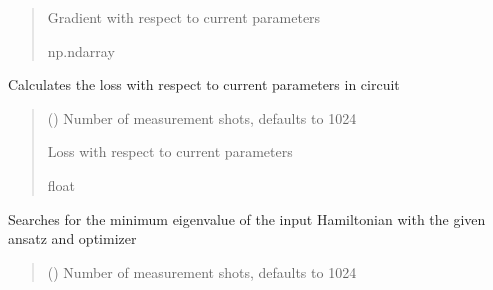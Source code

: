 \documentclass[letterpaper,10pt,english]{sphinxmanual}
\begin{document}
\begin{fulllineitems}
\begin{fulllineitems}
\begin{quote}
\begin{description}
\sphinxAtStartPar
Gradient with respect to current parameters

\sphinxAtStartPar
np.ndarray

\end{description}\end{quote}

\end{fulllineitems}


\begin{fulllineitems}
\label{\detokenize{qcompute_qapp.algorithm:qcompute_qapp.algorithm.SSVQE.get_loss}}
\pysigstartsignatures
{}
\pysigstopsignatures
\sphinxAtStartPar
Calculates the loss with respect to current parameters in circuit
\begin{quote}\begin{description}
\sphinxAtStartPar
{} () \textendash{} Number of measurement shots, defaults to 1024

\sphinxAtStartPar
Loss with respect to current parameters

\sphinxAtStartPar
float

\end{description}\end{quote}

\end{fulllineitems}


\begin{fulllineitems}
\label{\detokenize{qcompute_qapp.algorithm:qcompute_qapp.algorithm.SSVQE.run}}
\pysigstartsignatures
{}
\pysigstopsignatures
\sphinxAtStartPar
Searches for the minimum eigenvalue of the input Hamiltonian with the given ansatz and optimizer
\begin{quote}\begin{description}
\sphinxAtStartPar
{} () \textendash{} Number of measurement shots, defaults to 1024


\end{description}
\end{quote}
\end{fulllineitems}
\end{fulllineitems}
\end{document}
